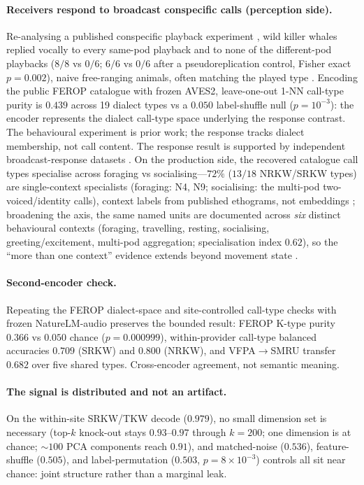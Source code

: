 \documentclass[11pt]{article}
\begin{document}
\paragraph{Receivers respond to broadcast conspecific calls (perception side).} Re-analysing
a published conspecific playback experiment \citep{filatova2011playback}, wild killer whales
replied vocally to every same-pod playback and to none of the different-pod playbacks ($8/8$
vs $0/6$; $6/6$ vs $0/6$ after a pseudoreplication control, Fisher exact $p=0.002$), naive
free-ranging animals, often matching the played type \citep{miller2004repertoires}. Encoding
the public FEROP catalogue \citep{russianorca_catalogue} with frozen AVES2, leave-one-out
1-NN call-type purity is $0.439$ across 19 dialect types vs a $0.050$ label-shuffle null
($p=10^{-3}$): the encoder represents the dialect call-type space underlying the response contrast. The
behavioural experiment is prior work; the response tracks dialect membership, not call content.
The response result is supported by independent broadcast-response datasets
\citep{selbmann2026aversive,bowers2018,miller2004repertoires}. On the production side, the
recovered catalogue call types specialise across foraging vs socialising---$72\%$ ($13/18$
NRKW/SRKW types) are single-context specialists (foraging: N4, N9; socialising: the multi-pod
two-voiced/identity calls), context labels from published ethograms, not embeddings
\citep{ford1989,foote2008}; broadening the axis, the same named units are documented across
\emph{six} distinct behavioural contexts (foraging, travelling, resting, socialising,
greeting/excitement, multi-pod aggregation; specialisation index $0.62$), so the
``more than one context'' evidence extends beyond movement state
\citep{riesch2008,yurk2002}.

\paragraph{Second-encoder check.} Repeating the FEROP dialect-space and site-controlled
call-type checks with frozen NatureLM-audio \citep{robinson2024naturelm} preserves the bounded
result: FEROP K-type purity $0.366$ vs $0.050$ chance ($p=0.000999$), within-provider call-type
balanced accuracies $0.709$ (SRKW) and $0.800$ (NRKW), and VFPA$\to$SMRU transfer $0.682$ over
five shared types. Cross-encoder agreement, not semantic meaning.

\paragraph{The signal is distributed and not an artifact.} On the within-site SRKW/TKW
decode ($0.979$), no small dimension set is necessary (top-$k$ knock-out stays $0.93$--$0.97$
through $k{=}200$; one dimension is at chance; $\sim\!100$ PCA components reach $0.91$), and
matched-noise ($0.536$), feature-shuffle ($0.505$), and label-permutation ($0.503$,
$p=8\times10^{-3}$) controls all sit near chance: joint structure rather than a marginal leak.
\end{document}
